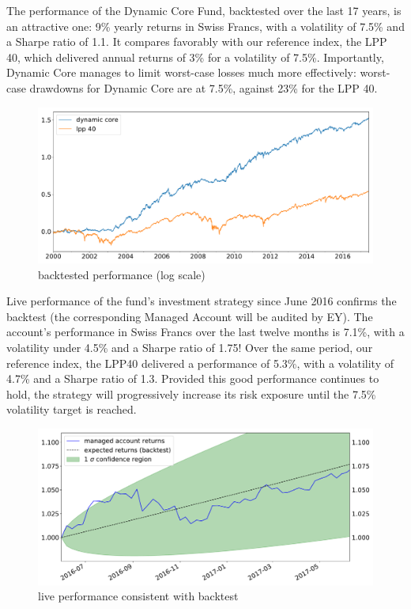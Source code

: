 \documentclass[letterpaper,12pt]{article}
\begin{document}
The performance of the Dynamic Core Fund, backtested over the last 17 years, is an attractive one: 9\% yearly returns in Swiss Francs, with a volatility of 7.5\% and a Sharpe ratio of 1.1. It compares favorably with our reference index, the LPP 40, which delivered annual returns of 3\% for a   volatility of 7.5\%. Importantly,  Dynamic Core manages to limit worst-case losses much more effectively: worst-case drawdowns for Dynamic Core are at 7.5\%, against 23\% for the LPP 40. 
\begin{figure}[!ht]
\centering
\includegraphics[width=.8\textwidth]{backtest_core.png}
\caption{backtested performance (log scale)}
\end{figure}



Live performance of the fund's investment strategy since June 2016  confirms the backtest (the corresponding  Managed Account will be audited by EY). The account's performance in Swiss Francs over the last twelve months is 7.1\%, with a volatility under 4.5\% and a Sharpe ratio of 1.75! Over the same period, our reference index, the LPP40 delivered a performance of 5.3\%,  with a volatility of 4.7\% and a Sharpe ratio of 1.3.   Provided this good performance continues to hold, the strategy will progressively increase its risk exposure until the 7.5\% volatility target is reached.
\begin{figure}[!ht]
\centering
\includegraphics[width=.9\textwidth]{account_returns.png}
\caption{live performance consistent with backtest}
\end{figure}
\end{document}
